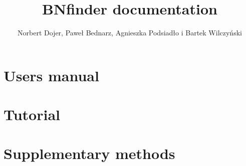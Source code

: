\documentclass{howto}
\title{ BNfinder documentation}
\author{Norbert Dojer, Paweł Bednarz, Agnieszka Podsiadło i Bartek Wilczyński}
\begin{document}
\maketitle
\tableofcontents
\newpage

\section{Users manual}
\label{sec:man}



\section{Tutorial}
\label{sec:tutor}



\section{Supplementary methods}



%

\end{document}
